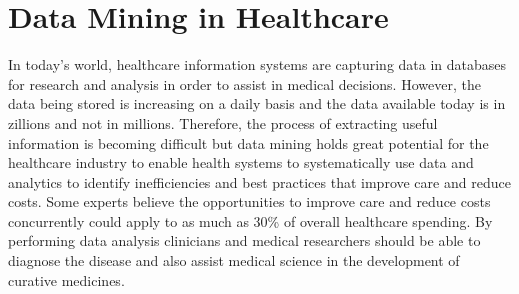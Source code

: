 \section{Data Mining in Healthcare}
In today's world, healthcare information systems are capturing data in databases for research and analysis in order to assist in medical decisions. However, the data being stored is increasing on a daily basis and the data available today is in zillions and not in millions. Therefore, the process of extracting useful information is becoming difficult but data mining holds great potential for the healthcare industry to enable health systems to systematically use data and analytics to identify inefficiencies and best practices that improve care and reduce costs. Some experts believe the opportunities to improve care and reduce costs concurrently could apply to as much as 30\% of overall healthcare spending. By performing data analysis clinicians and medical researchers should be able to diagnose the disease and also assist medical science in the development of curative medicines.
